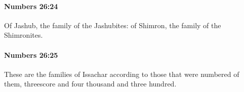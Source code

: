 		\paragraph{Numbers 26:24} %
			\label{NUMBERS-26-24}

			Of Jashub, the family of the Jashubites: of Shimron, the family of the Shimronites.


		\paragraph{Numbers 26:25} %
			\label{NUMBERS-26-25}

			These are the families of Issachar according to those that were numbered of them, threescore and four thousand and three hundred.


